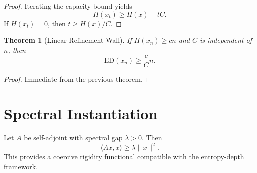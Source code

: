 \documentclass[11pt]{article}
\newtheorem{theorem}{Theorem}
\newcommand{\ED}{\mathrm{ED}}
\begin{document}
\begin{proof}
Iterating the capacity bound yields
\[
H(x_t)\ge H(x)-tC.
\]
If $H(x_t)=0$, then $t\ge H(x)/C$.
\end{proof}

\begin{theorem}[Linear Refinement Wall]
If $H(x_n)\ge c n$ and $C$ is independent of $n$, then
\[
\ED(x_n)\ge \frac{c}{C}n.
\]
\end{theorem}

\begin{proof}
Immediate from the previous theorem.
\end{proof}

\section{Spectral Instantiation}

Let $A$ be self-adjoint with spectral gap $\lambda>0$. Then
\[
\langle Ax,x\rangle \ge \lambda \|x\|^2.
\]
This provides a coercive rigidity functional compatible with the entropy-depth framework.
\end{document}

